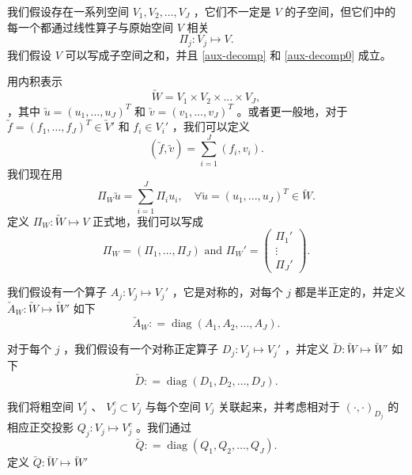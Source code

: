 \documentclass[12pt]{acta_2011xz}
\begin{document}
我们假设存在一系列空间
   $V_1, V_2, \dots, V_J$    ，它们不一定是
   $V$    的子空间，但它们中的每一个都通过线性算子与原始空间    $V$    相关
   \begin{equation} \Pi_j: V_j\mapsto
      V.  \end{equation}    我们假设    $V$    可以写成子空间之和，并且    \eqref{aux-decomp}    和    \eqref{aux-decomp0}    成立。  

用内积表示
   $$\utilde{W} = V_1\times V_2\times...\times V_J,
$$    ，其中    $\utilde u=(u_1,...,u_J)^T$    和    $\utilde
v=(v_1,...,v_J)^T$    。或者更一般地，对于    $\utilde f=(f_1, \ldots, f_J)^T\in
\utilde V'$    和    $f_i\in V_i'$    ，我们可以定义
   $$
( \utilde f, \utilde v) =\sum_{i=1}^J( f_i, v_i).
$$    我们现在用    $$
\Pi_W\utilde u = \sum_{i=1}^J \Pi_i u_i, \quad\forall \utilde
u=(u_1,...,u_J)^T\in \utilde W. 
$$    定义    $\Pi_W:\utilde W\mapsto V$    正式地，我们可以写成
   $$
\Pi_W=(\Pi_1,\ldots,\Pi_J) \mbox{ and }
\Pi_W'=
\begin{pmatrix}
\Pi_1' \\ 
\vdots \\ 
\Pi_J'
\end{pmatrix}.
$$     

我们假设有一个算子    $A_j: V_j\mapsto V_j'$   ，它是对称的，对每个    $j$    都是半正定的，并定义    $\utilde A_W: \utilde W\mapsto \utilde W'$    如下
   \begin{equation}\label{utildeAW}
      \utilde A_W: = \operatorname{diag}(A_1, A_2, \dots, A_J).
  \end{equation}     

对于每个    $j$    ，我们假设有一个对称正定算子    $D_j: V_j\mapsto V_j'$    ，并定义    $\utilde D:
    \utilde W\mapsto \utilde W'$    如下
   \begin{equation}\label{utildeD}
      \utilde D: = \operatorname{diag}(D_1, D_2, \dots, D_J).
  \end{equation}     

我们将粗空间    $V_j^c$    、    $V_j^c \subset V_j$    与每个空间    $V_j$    关联起来，并考虑相对于
   $(\cdot, \cdot)_{D_j}$    的相应正交投影    $Q_j: V_j\mapsto V_j^c$    。我们通过
   \begin{equation}
        \utilde Q: =\operatorname{diag}(Q_1, Q_2, \dots, Q_J).
    \end{equation}    定义    $\utilde Q: \utilde W\mapsto \utilde W'$     
\end{document}
